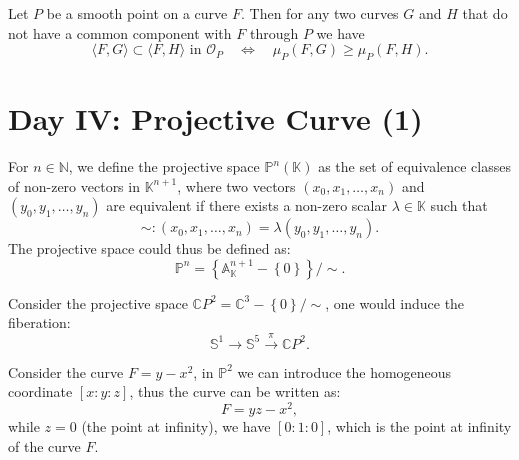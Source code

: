 \documentclass[10pt]{article}
\begin{document}
\begin{theorem}
  Let $ P$  be a smooth point on a curve $ F$. Then for any two curves $G$  and $H$  that do not have a common component with $F$ through $P$  we have
  \begin{equation*}
    \langle F,G\rangle\subset\langle F,H\rangle\text{ in }\mathscr{O}_P\quad\Leftrightarrow\quad\mu_P(F,G)\geq\mu_P(F,H).
  \end{equation*}
\end{theorem}

\section{Day IV: Projective Curve (1)}

\begin{definition}
  For $ n \in \mathbb{N}$, we define the projective space $ \mathbb{P}^{n}(\mathbb{K})$ as the set of equivalence classes of non-zero vectors in $ \mathbb{K}^{n+1}$, where two vectors $ (x_0, x_1, \ldots, x_n)$ and $ (y_0, y_1, \ldots, y_n)$ are equivalent if there exists a non-zero scalar $ \lambda \in \mathbb{K}$ such that
  \begin{equation*}
    \sim : (x_0, x_1, \ldots, x_n) = \lambda (y_0, y_1, \ldots, y_n).
  \end{equation*}
  The projective space could thus be defined as:
  \begin{equation*}
    \mathbb{P}^{n} = \left\{ \mathbb{A}_{\mathbb{K}}^{n+1} - \left\{ 0 \right\} \right\}/\sim .
  \end{equation*}
\end{definition}

\begin{example}
  Consider the projective space $ \mathbb{C}P^{2} = \mathbb{C}^{3} - \left\{ 0 \right\} / \sim $, one would induce the fiberation:
  \begin{equation*}
    \mathbb{S}^{1} \rightarrow \mathbb{S}^{5} \xrightarrow{\pi} \mathbb{C}P^{2}.
  \end{equation*}
\end{example}

\begin{example}
  Consider the curve $ F = y - x^{2}$, in $ \mathbb{P}^{2}$ we can introduce the homogeneous coordinate $[x:y:z]$, thus the curve can be written as:
  \begin{equation*}
    F = yz - x^{2},
  \end{equation*}
  while $ z = 0$ (the point at infinity), we have $[0:1:0]$, which is the point at infinity of the curve $ F$.
\end{example}
\end{document}
